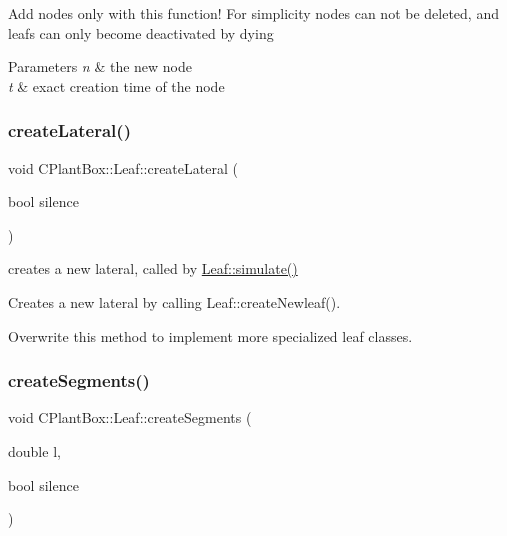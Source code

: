 Add nodes only with this function! For simplicity nodes can not be deleted, and leafs can only become deactivated by dying


\begin{DoxyParams}{Parameters}
{\em n} & the new node \\
\hline
{\em t} & exact creation time of the node \\
\hline
\end{DoxyParams}
\mbox{\label{classCPlantBox_1_1Leaf_a8778214ada72f26a9e9e71dcd8cac087}} 
\subsubsection{\texorpdfstring{create\+Lateral()}{createLateral()}}
{\footnotesize\ttfamily void C\+Plant\+Box\+::\+Leaf\+::create\+Lateral (\begin{DoxyParamCaption}\item[{bool}]{silence }\end{DoxyParamCaption})}



creates a new lateral, called by \hyperlink{classCPlantBox_1_1Leaf_ac8f35a92020107f44059b995e44af5d6}{Leaf\+::simulate()} 

Creates a new lateral by calling Leaf\+::create\+Newleaf().

Overwrite this method to implement more specialized leaf classes. \mbox{\label{classCPlantBox_1_1Leaf_ab41a29c6e050d8dd31690679e095b80e}} 
\subsubsection{\texorpdfstring{create\+Segments()}{createSegments()}}
{\footnotesize\ttfamily void C\+Plant\+Box\+::\+Leaf\+::create\+Segments (\begin{DoxyParamCaption}\item[{double}]{l,  }\item[{bool}]{silence }\end{DoxyParamCaption})\hspace{0.3cm}{\ttfamily [protected]}}



